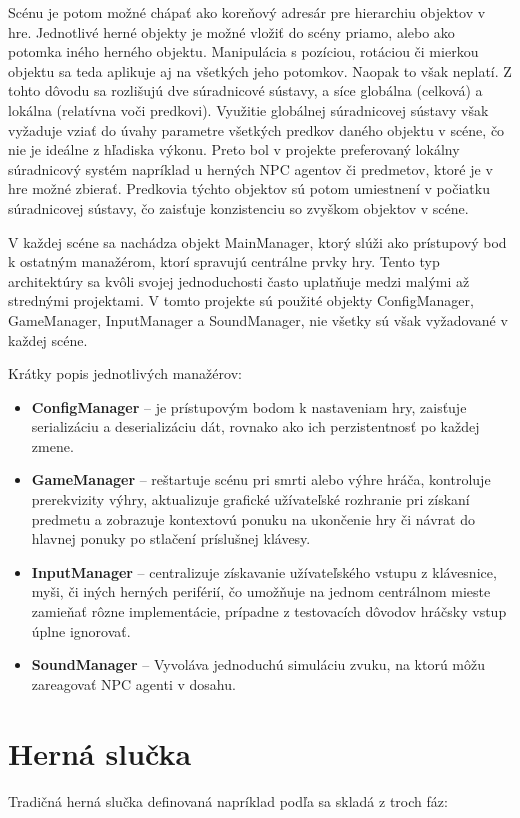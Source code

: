 \documentclass[slovak, master]{diploma}
\begin{document}
Scénu je potom možné chápať ako koreňový adresár pre hierarchiu objektov v hre. Jednotlivé herné objekty je možné vložiť do scény priamo, alebo ako potomka iného herného objektu. Manipulácia s pozíciou, rotáciou či mierkou objektu sa teda aplikuje aj na všetkých jeho potomkov. Naopak to však neplatí. Z tohto dôvodu sa rozlišujú dve súradnicové sústavy, a síce globálna (celková) a lokálna (relatívna voči predkovi). Využitie globálnej súradnicovej sústavy však vyžaduje vziať do úvahy parametre všetkých predkov daného objektu v scéne, čo nie je ideálne z hľadiska výkonu. Preto bol v projekte preferovaný lokálny súradnicový systém napríklad u herných NPC agentov či predmetov, ktoré je v hre možné zbierať. Predkovia týchto objektov sú potom umiestnení v počiatku súradnicovej sústavy, čo zaisťuje konzistenciu so zvyškom objektov v scéne.

V každej scéne sa nachádza objekt MainManager, ktorý slúži ako prístupový bod k ostatným manažérom, ktorí spravujú centrálne prvky hry. Tento typ architektúry sa kvôli svojej jednoduchosti často uplatňuje medzi malými až strednými projektami. V tomto projekte sú použité objekty ConfigManager, GameManager, InputManager a SoundManager, nie všetky sú však vyžadované v každej scéne. 

Krátky popis jednotlivých manažérov:
\begin{itemize}
  \item \textbf{ConfigManager} -- je prístupovým bodom k nastaveniam hry, zaisťuje serializáciu a deserializáciu dát, rovnako ako ich perzistentnosť po každej zmene.
  \item \textbf{GameManager} -- reštartuje scénu pri smrti alebo výhre hráča, kontroluje prerekvizity výhry, aktualizuje grafické užívateľské rozhranie pri získaní predmetu a zobrazuje kontextovú ponuku na ukončenie hry či návrat do hlavnej ponuky po stlačení príslušnej klávesy.
  \item \textbf{InputManager} -- centralizuje získavanie užívateľského vstupu z klávesnice, myši, či iných herných periférií, čo umožňuje na jednom centrálnom mieste zamieňať rôzne implementácie, prípadne z testovacích dôvodov hráčsky vstup úplne ignorovať. 
  \item \textbf{SoundManager} -- Vyvoláva jednoduchú simuláciu zvuku, na ktorú môžu zareagovať NPC agenti v dosahu.
\end{itemize}

\section{Herná slučka}
\label{sec:GameLoop}
Tradičná herná slučka definovaná napríklad podľa \cite{GameAlgorithms} sa skladá z troch fáz:
\end{document}

